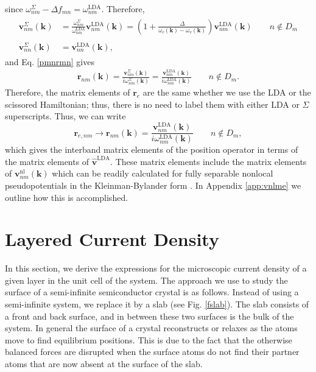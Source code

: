 since $\omega^\Sigma_{nm}-\Delta f_{mn}=\omega^{\mathrm{LDA}}_{nm}$. Therefore,
\begin{align}\label{chon.9}
\begin{split}
\mathbf{v}^\Sigma_{nm}(\mathbf{k}) &=
\frac{\omega^\Sigma_{nm}}{\omega^{\mathrm{LDA}}_{nm}}
\mathbf{v}^\mathrm{LDA}_{nm}(\mathbf{k})
= \left(
1 + \frac{\Delta}{\omega_c(\mathbf{k})-\omega_v(\mathbf{k})}
\right)
\mathbf{v}^\mathrm{LDA}_{nm}(\mathbf{k})\qquad n\notin D_{m}\\\\
\mathbf{v}^\Sigma_{nn}(\mathbf{k}) &= \mathbf{v}^\mathrm{LDA}_{nn}(\mathbf{k}),
\end{split}
\end{align} 
and Eq. \eqref{pmnrmn} gives
\begin{align}\label{chon.10}
\mathbf{r}_{nm}(\mathbf{k})
= \frac{\mathbf{v}^\Sigma_{nm}(\mathbf{k})}{i\omega^\Sigma_{nm}(\mathbf{k})}
= \frac{\mathbf{v}^\mathrm{LDA}_{nm}(\mathbf{k})}
{i\omega^{\mathrm{LDA}}_{nm}(\mathbf{k})} \qquad n\notin D_{m}.
\end{align}
Therefore, the matrix elements of $\mathbf{r}_{e}$ are the same whether we use
the LDA or the scissored Hamiltonian; thus, there is no need to label them
with either LDA or $\Sigma$ superscripts. Thus, we can write
\begin{equation}\label{chon.98}
\mathbf{r}_{e,nm}\to\mathbf{r}_{nm}(\mathbf{k}) =
\frac{\mathbf{v}^\mathrm{LDA}_{nm}(\mathbf{k})}
     {i\omega^{\mathrm{LDA}}_{nm}(\mathbf{k})}
\qquad n\notin D_{m},
\end{equation}   
which gives the interband matrix elements of the position operator in terms of
the matrix elements of $\hat{\mathbf{v}}^\mathrm{LDA}$. These matrix elements
include the matrix elements of $\mathbf{v}^{\mathrm{nl}}_{nm}(\mathbf{k})$ which
can be readily calculated for fully separable nonlocal pseudopotentials in the
Kleinman-Bylander form \cite{mottaCMS10, kleinmanPRL82, adolphPRB96}. In
Appendix \ref{app:vnlme} we outline how this is accomplished.



\section{Layered Current Density}\label{cd}

In this section, we derive the expressions for the microscopic current density
of a given layer in the unit cell of the system. The approach we use to study
the surface of a semi-infinite semiconductor crystal is as follows. Instead of
using a semi-infinite system, we replace it by a slab (see Fig. \ref{fslab}).
The slab consists of a front and back surface, and in between these two surfaces
is the bulk of the system. In general the surface of a crystal reconstructs or
relaxes as the atoms move to find equilibrium positions. This is due to the fact
that the otherwise balanced forces are disrupted when the surface atoms do not
find their partner atoms that are now absent at the surface of the slab.

